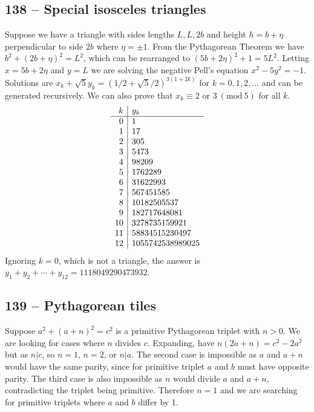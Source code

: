 \documentclass{article}
\newcommand{\Mod}[1]{\ (\mathrm{mod}\ #1)}
\begin{document}
\subsection*{138 -- Special isosceles triangles} 
Suppose we have a triangle with sides lengths $L, L, 2b$ and height $h = b + \eta$ perpendicular to side $2b$ where $\eta = \pm 1$. 
From the Pythagorean Theorem we have $b^2 + (2b+\eta)^2 = L^2$, which can be rearranged to $(5b+2\eta)^2+1 = 5L^2$. 
Letting $x = 5b+2\eta$ and $y= L$ we are solving the negative Pell's equation $x^2 - 5y^2 = -1$. 
Solutions are $x_k + \sqrt{5} y_k = (1/2 + \sqrt{5}/2)^{3(1 + 2k)}$ for $k = 0, 1, 2, \dotsc$ and can be generated recursively. 
We can also prove that $x_k \equiv 2$ or $3 \Mod{5}$ for all $k$. 
\begin{align*}
	\begin{array}{r | l }
	k & y_k \\ \hline
	0 & 1 \\ 
	1 & 17 \\
	2 & 305 \\
	3 & 5473 \\
	4 & 98209 \\
	5 & 1762289 \\
	6 & 31622993 \\
	7 & 567451585 \\
	8 & 10182505537 \\
	9 & 182717648081 \\
	10 & 3278735159921 \\
	11 & 58834515230497 \\
	12 & 1055742538989025
	\end{array}
\end{align*}
Ignoring $k=0$, which is not a triangle, the answer is $y_1 + y_2 + \cdots + y_{12} = \boxed{1118049290473932}$.


\subsection*{139 -- Pythagorean tiles} 
Suppose $a^2 + (a+n)^2 = c^2$ is a primitive Pythagorean triplet with $n > 0$. 
We are looking for cases where $n$ divides $c$. 
Expanding, have $n(2a +n) = c^2 - 2a^2$ but as $n|c$, so $n=1$, $n=2$, or $n|a$. 
The second case is impossible as $a$ and $a+n$ would have the same parity, since for primitive triplet $a$ and $b$ must have opposite parity.
The third case is also impossible as $n$ would divide $a$ and $a+n$, contradicting the triplet being primitive.
Therefore $n=1$ and we are searching for primitive triplets where $a$ and $b$ differ by 1. \\
\end{document}
